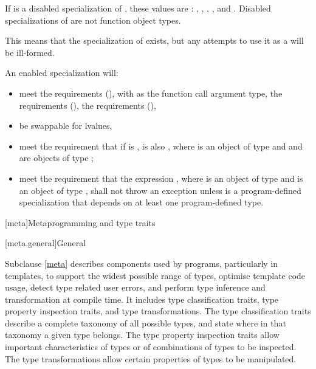 \pnum
If  is a disabled specialization of ,
these values are :
,
,
,
, and
.
Disabled specializations of 
are not function object types.
\begin{note}
This means that the specialization of  exists, but
any attempts to use it as a  will be ill-formed.
\end{note}

\pnum
An enabled specialization  will:
\begin{itemize}
\item meet the  requirements (),
with  as the function
call argument type, the  requirements (),
the  requirements (),
\item be swappable for lvalues,
\item meet the requirement that if  is ,  is
also , where  is an object of type  and  and 
are objects of type ;
\item meet the requirement that the expression , where 
is an object of type  and  is an object of type
, shall not throw an exception unless  is a
program-defined specialization that depends on at least one program-defined type.
\end{itemize}

[meta]{Metaprogramming and type traits}

[meta.general]{General}

\pnum
Subclause \ref{meta} describes components used by \Cpp{} programs, particularly in
templates, to support the widest possible range of types, optimise
template code usage, detect type related user errors, and perform
type inference and transformation at compile time. It includes type
classification traits, type property inspection traits, and type
transformations. The type classification traits describe a complete taxonomy
of all possible \Cpp{} types, and state where in that taxonomy a given
type belongs. The type property inspection traits allow important
characteristics of types or of combinations of types to be inspected. The
type transformations allow certain properties of types to be manipulated.

